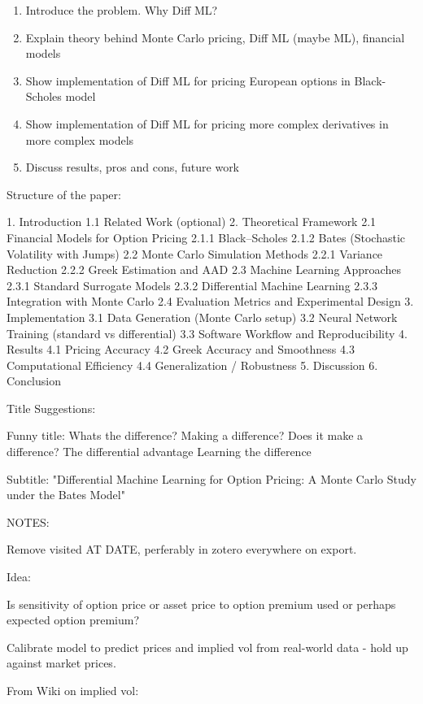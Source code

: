 \begin{enumerate}
    \item Introduce the problem. Why Diff ML? 
    \item Explain theory behind Monte Carlo pricing, Diff ML (maybe ML), financial models 
    \item Show implementation of Diff ML for pricing European options in Black-Scholes model
    \item Show implementation of Diff ML for pricing more complex derivatives in more complex models
    \item Discuss results, pros and cons, future work  
\end{enumerate}

Structure of the paper: 

1. Introduction
   1.1 Related Work (optional)
2. Theoretical Framework
   2.1 Financial Models for Option Pricing
       2.1.1 Black–Scholes
       2.1.2 Bates (Stochastic Volatility with Jumps)
   2.2 Monte Carlo Simulation Methods
       2.2.1 Variance Reduction
       2.2.2 Greek Estimation and AAD
   2.3 Machine Learning Approaches
       2.3.1 Standard Surrogate Models
       2.3.2 Differential Machine Learning
       2.3.3 Integration with Monte Carlo
   2.4 Evaluation Metrics and Experimental Design
3. Implementation
   3.1 Data Generation (Monte Carlo setup)
   3.2 Neural Network Training (standard vs differential)
   3.3 Software Workflow and Reproducibility
4. Results
   4.1 Pricing Accuracy
   4.2 Greek Accuracy and Smoothness
   4.3 Computational Efficiency
   4.4 Generalization / Robustness
5. Discussion
6. Conclusion

Title Suggestions: 

Funny title: 
Whats the difference? 
Making a difference? 
Does it make a difference? 
The differential advantage
Learning the difference

Subtitle:
"Differential Machine Learning for Option Pricing: A Monte Carlo Study under the Bates Model"

NOTES:

Remove visited AT DATE, perferably in zotero everywhere on export. 

Idea:

Is sensitivity of option price or asset price to option premium used or perhaps expected option premium?

Calibrate model to predict prices and implied vol from real-world data - hold up against market prices. 

From Wiki on implied vol:

